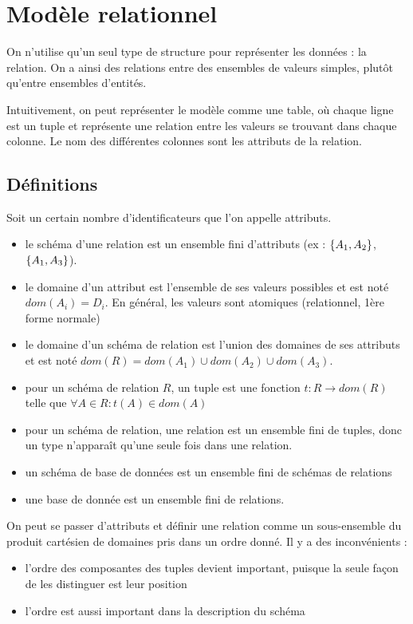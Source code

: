 \chapter{Modèle relationnel}

On n'utilise qu'un seul type de structure pour représenter les données : la relation. On a ainsi des relations entre des ensembles de valeurs simples, plutôt qu'entre ensembles d'entités.

Intuitivement, on peut représenter le modèle comme une table, où chaque ligne est un tuple et représente une relation entre les valeurs se trouvant dans chaque colonne. Le nom des différentes colonnes sont les attributs de la relation.


	\section{Définitions}

	Soit un certain nombre d'identificateurs que l'on appelle attributs.	
	
	\begin{itemize}
		\item le schéma d'une relation est un ensemble fini d'attributs (ex : $\lbrace A_1, A_2 \rbrace$, $\lbrace A_1, A_3 \rbrace$).
		\item le domaine d'un attribut est l'ensemble de ses valeurs possibles et est noté $dom(A_i) = D_i$. En général, les valeurs sont atomiques (relationnel, 1ère forme normale)
		\item le domaine d'un schéma de relation est l'union des domaines de ses attributs et est noté $dom(R) = dom(A_1) \cup dom(A_2) \cup dom(A_3)$.
		\item pour un schéma de relation $R$, un tuple est une fonction $t : R \rightarrow dom(R)$ telle que $\forall A \in R : t(A) \in dom(A)$
		\item pour un schéma de relation, une relation est un ensemble fini de tuples, donc un type n'apparaît qu'une seule fois dans une relation.
		\item un schéma de base de données est un ensemble fini de schémas de relations
		\item une base de donnée est un ensemble fini de relations.
	\end{itemize}
	
	On peut se passer d'attributs et définir une relation comme un sous-ensemble du produit cartésien de domaines pris dans un ordre donné. Il y a des inconvénients :
	
	\begin{itemize}
		\item l'ordre des composantes des tuples devient important, puisque la seule façon de les distinguer est leur position
		\item l'ordre est aussi important dans la description du schéma
	\end{itemize}
	
